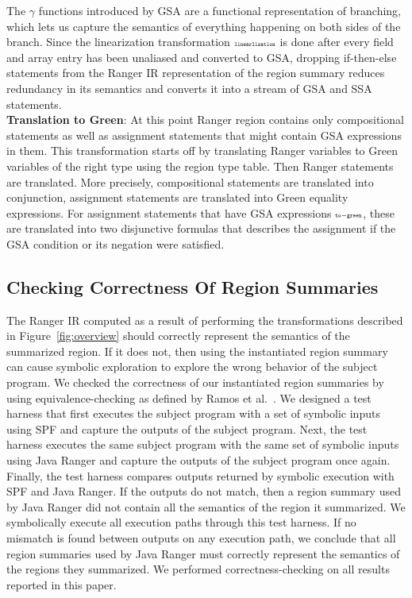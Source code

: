 %
The $\gamma$ functions introduced by GSA are a functional representation of branching, which lets us
capture the semantics of everything happening on both sides of the branch.
%
Since the linearization transformation $\scriptscriptstyle\mathtt{linearlization}$ is done after every field and array entry has been unaliased and converted to
GSA, dropping if-then-else statements from the Ranger IR representation of the region summary reduces redundancy in its
semantics and converts it into a stream of GSA and SSA statements.\\
\textbf{Translation to Green}:
%
At this point Ranger region contains only compositional statements as well as assignment statements that might contain GSA expressions in them.
%
This transformation starts off by translating Ranger variables to Green variables of the right type using the region type table.
%
Then Ranger statements are translated. More precisely, compositional statements are translated into conjunction, assignment statements are translated into Green equality expressions.
%
For assignment statements that have GSA expressions $\scriptscriptstyle\mathtt{to-green}$, these are translated into two disjunctive formulas that describes the assignment if the GSA condition or its negation were satisfied. 

\subsection{Checking Correctness Of Region Summaries}
The Ranger IR computed as a result of performing the transformations described in Figure~\ref{fig:overview} should
correctly represent the semantics of the summarized region.
%
If it does not, then using the instantiated region summary can cause symbolic exploration to explore the wrong behavior
of the subject program.
%
We checked the correctness of our instantiated region summaries by using equivalence-checking as defined by Ramos et al.~\cite{ramos}.
%
We designed a test harness that first executes the subject program with a set of symbolic inputs using SPF and
capture the outputs of the subject program.
%
Next, the test harness executes the same subject program with the same set of symbolic inputs using Java Ranger and
capture the outputs of the subject program once again.
%
Finally, the test harness compares outputs returned by symbolic execution with SPF and Java Ranger.
%
If the outputs do not match, then a region summary used by Java Ranger did not contain all the semantics
of the region it summarized.
%
We symbolically execute all execution paths through this test harness.
%
If no mismatch is found between outputs on any execution path, we conclude that all region summaries used by Java Ranger
must correctly represent the semantics of the regions they summarized.
%
We performed correctness-checking on all results reported in this paper.
